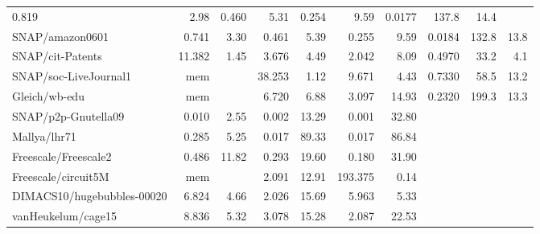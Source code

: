 \documentclass[12pt]{article}
\begin{document}
{\begin{tabular}{|l|rr|rr|rr||rrr|}
    0.819  &     2.98 &  %
    0.460  &     5.31 &  %
    0.254  &     9.59 &  %
    0.0177 &   137.8  &     14.4 \\ %
SNAP/amazon0601 & %
    0.741  &     3.30 &  %
    0.461  &     5.39 &  %
    0.255  &     9.59 &  %
    0.0184 &   132.8  &     13.8 \\ %
SNAP/cit-Patents & %
   11.382  &     1.45 &  %
    3.676  &     4.49 &  %
    2.042  &     8.09 &  %
    0.4970 &    33.2  &      4.1 \\ %
SNAP/soc-LiveJournal1 & %
       mem &          &  %
   38.253  &     1.12 &  %
    9.671  &     4.43 &  %
    0.7330 &    58.5  &     13.2 \\ %
Gleich/wb-edu & %
       mem &          &  %
    6.720  &     6.88 &  %
    3.097  &    14.93 &  %
    0.2320 &   199.3  &     13.3 \\ %
\hline
SNAP/p2p-Gnutella09 &
    0.010  &     2.55 &  %
    0.002  &    13.29 &  %
    0.001  &    32.80 &  %
           &          & \\ %
Mallya/lhr71 & %
    0.285  &     5.25 &  %
    0.017  &    89.33 &  %
    0.017  &    86.84 &  %
           &          & \\ %
Freescale/Freescale2 & %
     0.486 &    11.82 &  %
     0.293 &    19.60 &  %
     0.180 &    31.90 &  %
           &          & \\ %
Freescale/circuit5M & %
       mem &          &  %
    2.091  &    12.91 &  %
  193.375  &     0.14 &  %
           &          & \\ %
DIMACS10/hugebubbles-00020 & %
    6.824  &     4.66 &  %
    2.026  &    15.69 &  %
    5.963  &     5.33 &  %
           &          & \\ %
vanHeukelum/cage15 & %
    8.836  &     5.32 &  %
    3.078  &    15.28 &  %
    2.087  &    22.53 &  %
           &          & \\ %
\hline
\end{tabular}
}
\vspace{0.3in}
\end{document}
